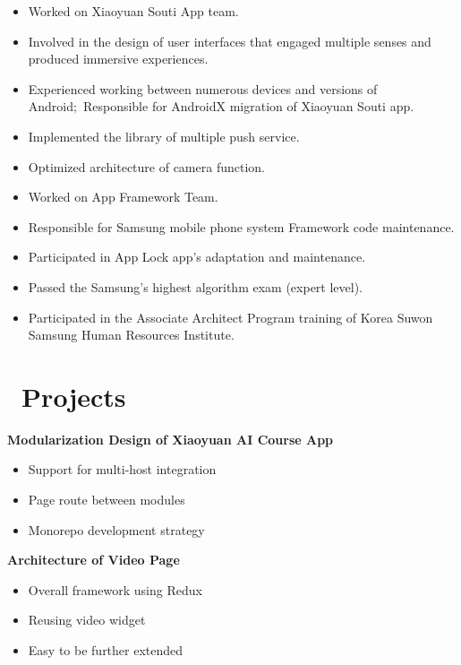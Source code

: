 \documentclass{resume}
\begin{document}
\begin{itemize}
  \item Worked on Xiaoyuan Souti App team.
  \item Involved in the design of user interfaces that engaged multiple senses and produced immersive experiences.
  \item Experienced working between numerous devices and versions of Android;\ Responsible for AndroidX migration of Xiaoyuan Souti app.
  \item Implemented the library of multiple push service.
  \item Optimized architecture of camera function.
\end{itemize}

\begin{itemize}
  \item Worked on App Framework Team.
  \item Responsible for Samsung mobile phone system Framework code maintenance.
  \item Participated in App Lock app's adaptation and maintenance.
  \item Passed the Samsung's highest algorithm exam (expert level).
  \item Participated in the Associate Architect Program training of Korea Suwon Samsung Human Resources Institute.
\end{itemize}

\section{\faFileCodeO\ Projects}
\textbf{Modularization Design of Xiaoyuan AI Course App}
\begin{itemize}
  \item Support for multi-host integration
  \item Page route between modules
  \item Monorepo development strategy
\end{itemize}

\textbf{Architecture of Video Page}
\begin{itemize}
  \item Overall framework using Redux
  \item Reusing video widget
  \item Easy to be further extended
\end{itemize}
\end{document}
